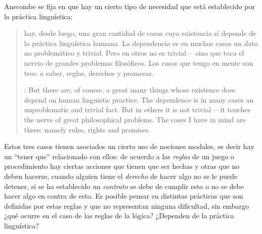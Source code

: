Anscombe se fija en que hay un cierto tipo de necesidad que está establecido por la práctica linguística: \blockquote[{\cite[118]{anscombe1981parmenides:qli}}: But there are, of course, a great many things whose existence does depend on human linguistic practice. The dependence is in many cases an unproblematic and trivial fact. But in others it is not trivial\,---\,it touches the nerve of great philosophical problems. The cases I have in mind are three: namely rules, rights and promises.]{hay, desde luego, una gran cantidad de cosas cuya existencia sí depende de la práctica linguística humana. La dependencia es en muchos casos un dato no problemático y trivial. Pero en otros no es trivial\,---\,sino que toca el nervio de grandes problemas filosóficos. Los casos que tengo en mente son tres: a saber, reglas, derechos y promesas.} Estos tres casos tienen asociados un cierto uso de nociones modales, es decir hay un \enquote{tener que} relacionado con ellos: de acuerdo a las \emph{reglas} de un juego o procedimiento hay ciertas acciones que tienen que ser hechas y otras que no deben hacerse, cuando alguien tiene el \emph{derecho} de hacer algo no se le puede detener, si se ha establecido un \emph{contrato} se debe de cumplir esto o no se debe hacer algo en contra de esto. Es posible pensar en distintas prácticas que son definidas por estas reglas y que no representan ninguna dificultad, sin embargo ¿qué ocurre en el caso de las reglas de la lógica? ¿Dependen de la práctica linguística?


